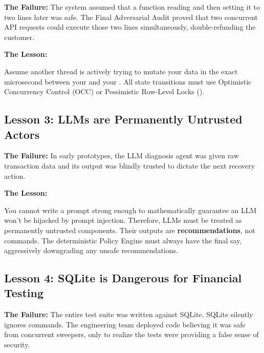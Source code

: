 \textbf{The Failure:} The system assumed that a function reading  and then setting it to  two lines later was safe. The Final Adversarial Audit proved that two concurrent API requests could execute those two lines simultaneously, double-refunding the customer.

\textbf{The Lesson:}
\begin{tcolorbox}[infobox={Concurrency is Hostile}]
Assume another thread is actively trying to mutate your data in the exact microsecond between your  and your . All state transitions must use Optimistic Concurrency Control (OCC) or Pessimistic Row-Level Locks ().
\end{tcolorbox}

\vspace{0.5cm}

\subsection{Lesson 3: LLMs are Permanently Untrusted Actors}

\textbf{The Failure:} In early prototypes, the LLM diagnosis agent was given raw transaction data and its output was blindly trusted to dictate the next recovery action.

\textbf{The Lesson:}
\begin{tcolorbox}[infobox={The Policy Engine Boundary}]
You cannot write a prompt strong enough to mathematically guarantee an LLM won't be hijacked by prompt injection. Therefore, LLMs must be treated as permanently untrusted components. Their outputs are \textbf{recommendations}, not commands. The deterministic Policy Engine must always have the final say, aggressively downgrading any unsafe recommendations.
\end{tcolorbox}

\vspace{0.5cm}

\subsection{Lesson 4: SQLite is Dangerous for Financial Testing}

\textbf{The Failure:} The entire test suite was written against SQLite. SQLite silently ignores  commands. The engineering team deployed code believing it was safe from concurrent sweepers, only to realize the tests were providing a false sense of security.

